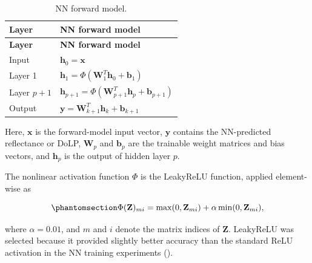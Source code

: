 \documentclass[
  11pt,
  letterpaper,
]{scrreprt}
\begin{document}
\begin{longtable}[]{@{}
  >{\raggedright\arraybackslash}p{}
  >{\raggedright\arraybackslash}p{}@{}}
\caption{NN forward model.}\label{tbl-nn-forward}\tabularnewline
\toprule\noalign{}
\begin{minipage}[b]{\linewidth}\raggedright
\textbf{Layer}
\end{minipage} & \begin{minipage}[b]{\linewidth}\raggedright
\textbf{NN forward model}
\end{minipage} \\
\midrule\noalign{}
\endfirsthead
\toprule\noalign{}
\begin{minipage}[b]{\linewidth}\raggedright
\textbf{Layer}
\end{minipage} & \begin{minipage}[b]{\linewidth}\raggedright
\textbf{NN forward model}
\end{minipage} \\
\midrule\noalign{}
\endhead
\bottomrule\noalign{}
\endlastfoot
Input & \(\mathbf{h}_0=\mathbf{x}\) \\
Layer 1 &
\(\mathbf{h}_1=\Phi(\mathbf{W}_1^T\mathbf{h}_0+\mathbf{b}_1)\) \\
Layer \(p+1\) &
\(\mathbf{h}_{p+1}=\Phi(\mathbf{W}_{p+1}^T\mathbf{h}_p+\mathbf{b}_{p+1})\) \\
Output &
\(\mathbf{y}=\mathbf{W}_{k+1}^T\mathbf{h}_k+\mathbf{b}_{k+1}\) \\
\end{longtable}

Here, \(\mathbf{x}\) is the forward-model input vector, \(\mathbf{y}\)
contains the NN-predicted reflectance or DoLP, \(\mathbf{W}_p\) and
\(\mathbf{b}_p\) are the trainable weight matrices and bias vectors, and
\(\mathbf{h}_p\) is the output of hidden layer \(p\).

The nonlinear activation function \(\Phi\) is the LeakyReLU function,
applied element-wise as

\begin{equation}\phantomsection\label{eq-leakyrelu}{
\Phi(\mathbf{Z})_{mi}
=
\max(0,\mathbf{Z}_{mi})
+
\alpha\min(0,\mathbf{Z}_{mi}),
}\end{equation}

where \(\alpha=0.01\), and \(m\) and \(i\) denote the matrix indices of
\(\mathbf{Z}\). LeakyReLU was selected because it provided slightly
better accuracy than the standard ReLU activation in the NN training
experiments ().
\end{document}

